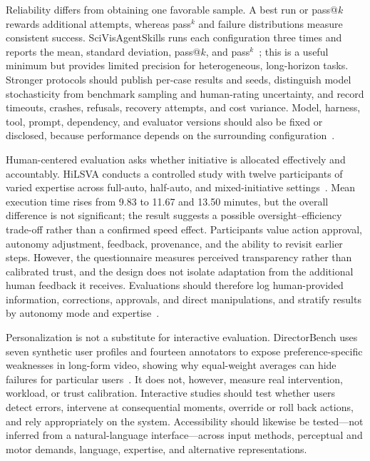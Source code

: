 Reliability differs from obtaining one favorable sample. A best run or pass@$k$ rewards additional attempts, whereas pass$^k$ and failure distributions measure consistent success. SciVisAgentSkills runs each configuration three times and reports the mean, standard deviation, pass@$k$, and pass$^k$~\cite{avg260605525}; this is a useful minimum but provides limited precision for heterogeneous, long-horizon tasks. Stronger protocols should publish per-case results and seeds, distinguish model stochasticity from benchmark sampling and human-rating uncertainty, and record timeouts, crashes, refusals, recovery attempts, and cost variance. Model, harness, tool, prompt, dependency, and evaluator versions should also be fixed or disclosed, because performance depends on the surrounding configuration~\cite{avg260608091}.

Human-centered evaluation asks whether initiative is allocated effectively and accountably. HiLSVA conducts a controlled study with twelve participants of varied expertise across full-auto, half-auto, and mixed-initiative settings~\cite{avg260626614}. Mean execution time rises from 9.83 to 11.67 and 13.50 minutes, but the overall difference is not significant; the result suggests a possible oversight--efficiency trade-off rather than a confirmed speed effect. Participants value action approval, autonomy adjustment, feedback, provenance, and the ability to revisit earlier steps. However, the questionnaire measures perceived transparency rather than calibrated trust, and the design does not isolate adaptation from the additional human feedback it receives. Evaluations should therefore log human-provided information, corrections, approvals, and direct manipulations, and stratify results by autonomy mode and expertise~\cite{avg260626614}.

Personalization is not a substitute for interactive evaluation. DirectorBench uses seven synthetic user profiles and fourteen annotators to expose preference-specific weaknesses in long-form video, showing why equal-weight averages can hide failures for particular users~\cite{avg260530090}. It does not, however, measure real intervention, workload, or trust calibration. Interactive studies should test whether users detect errors, intervene at consequential moments, override or roll back actions, and rely appropriately on the system. Accessibility should likewise be tested---not inferred from a natural-language interface---across input methods, perceptual and motor demands, language, expertise, and alternative representations.

